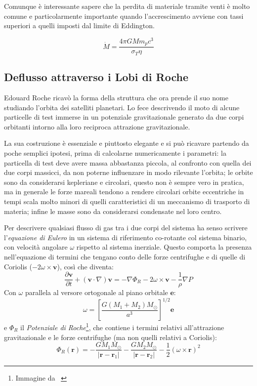 \documentclass[a4paperbi]{article}
\begin{document}
	Comunque è interessante sapere che la perdita di materiale tramite venti è molto comune e particolarmente importante quando l'accrescimento avviene con tassi superiori a quelli imposti dal limite di Eddington.
	
	\begin{equation}
		\dot{M}=\frac{4\pi GMm_pc^3}{\sigma_T \eta}
	\end{equation}

\subsection{Deflusso attraverso i Lobi di Roche}
	Edouard Roche ricavò la forma della struttura che ora prende il suo nome studiando l'orbita dei satelliti planetari. Lo fece descrivendo il moto di alcune particelle di test immerse in un potenziale gravitazionale generato da due corpi orbitanti intorno alla loro reciproca attrazione gravitazionale.
	
	La sua costruzione è essenziale e piuttosto elegante e si può ricavare partendo da poche semplici ipotesi, prima di calcolarne numericamente i parametri: la particella di test deve avere massa abbastanza piccola, al confronto con quella dei due corpi massicci, da non poterne influenzare in modo rilevante l'orbita; le orbite sono da considerarsi kepleriane e circolari, questo non è sempre vero in pratica, ma in generale le forze mareali tendono a rendere circolari orbite eccentriche in tempi scala molto minori di quelli caratteristici di un meccanismo di trasporto di materia; infine le masse sono da considerarsi condensate nel loro centro.
	
	Per descrivere qualsiasi flusso di gas tra i due corpi del sistema ha senso scrivere l'\textit{equazione di Eulero} in un sistema di riferimento co-rotante col sistema binario, con velocità angolare $\omega$ rispetto al sistema inerziale. Questo comporta la presenza nell'equazione di termini che tengano conto delle forze centrifughe e di quelle di Coriolis ($-2\omega\times\textbf{v}$), così che diventa:
	\begin{equation}
		\frac{\partial \textbf{v}}{\partial t}+(\textbf{v}\cdot\nabla)\textbf{v}=-\nabla\Phi_R-2\omega\times\textbf{v}-\frac{1}{\rho}\nabla P
	\end{equation}
	Con $\omega$ parallela al versore ortogonale al piano orbitale $\textbf{e}$:
	\begin{equation}
		\omega=\left[\frac{G(M_1+M_2)M_\odot}{a^3}\right]^{1/2}\textbf{e}
	\end{equation}
	e $\Phi_R$ il \textit{Potenziale di Roche}\footnote{Immagine da ~\cite{FrankKingRaineAccretionPower}}, che contiene i termini relativi all'attrazione gravitazionale e le forze centrifughe (ma non quelli relativi a Coriolis):
	\begin{equation}
		\Phi_R(\textbf{r})=-\frac{GM_1M_\odot}{\vert\textbf{r}-\textbf{r}_1\vert}-\frac{GM_2M_\odot}{\vert\textbf{r}-\textbf{r}_2\vert}-\frac{1}{2}(\omega\times\textbf{r})^2
	\end{equation}
	
\end{document}
